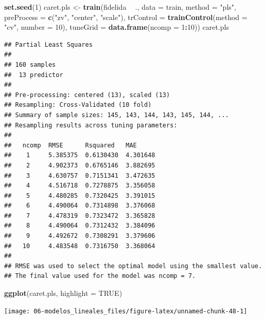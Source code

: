 \documentclass[
  spanish,
]{book}
\newenvironment{Shaded}{\begin{snugshade}}{\end{snugshade}}
\newcommand{\DataTypeTok}[1]{\textcolor[rgb]{0.13,0.29,0.53}{#1}}
\newcommand{\DecValTok}[1]{\textcolor[rgb]{0.00,0.00,0.81}{#1}}
\newcommand{\KeywordTok}[1]{\textcolor[rgb]{0.13,0.29,0.53}{\textbf{#1}}}
\newcommand{\NormalTok}[1]{#1}
\newcommand{\OperatorTok}[1]{\textcolor[rgb]{0.81,0.36,0.00}{\textbf{#1}}}
\newcommand{\OtherTok}[1]{\textcolor[rgb]{0.56,0.35,0.01}{#1}}
\newcommand{\StringTok}[1]{\textcolor[rgb]{0.31,0.60,0.02}{#1}}
\theoremstyle{break}
\theoremstyle{definition}
\theoremstyle{definition}
\theoremstyle{definition}
\theoremstyle{remark}
\begin{document}
\begin{Shaded}
\begin{Highlighting}[]
\KeywordTok{set.seed}\NormalTok{(}\DecValTok{1}\NormalTok{)}
\NormalTok{caret.pls <-}\StringTok{ }\KeywordTok{train}\NormalTok{(fidelida }\OperatorTok{~}\StringTok{ }\NormalTok{., }\DataTypeTok{data =}\NormalTok{ train, }\DataTypeTok{method =} \StringTok{"pls"}\NormalTok{,}
                   \DataTypeTok{preProcess =} \KeywordTok{c}\NormalTok{(}\StringTok{"zv"}\NormalTok{, }\StringTok{"center"}\NormalTok{, }\StringTok{"scale"}\NormalTok{),}
                   \DataTypeTok{trControl =} \KeywordTok{trainControl}\NormalTok{(}\DataTypeTok{method =} \StringTok{"cv"}\NormalTok{, }\DataTypeTok{number =} \DecValTok{10}\NormalTok{),}
                   \DataTypeTok{tuneGrid =} \KeywordTok{data.frame}\NormalTok{(}\DataTypeTok{ncomp =} \DecValTok{1}\OperatorTok{:}\DecValTok{10}\NormalTok{))}
\NormalTok{caret.pls}
\end{Highlighting}
\end{Shaded}

\begin{verbatim}
## Partial Least Squares 
## 
## 160 samples
##  13 predictor
## 
## Pre-processing: centered (13), scaled (13) 
## Resampling: Cross-Validated (10 fold) 
## Summary of sample sizes: 145, 143, 144, 143, 145, 144, ... 
## Resampling results across tuning parameters:
## 
##   ncomp  RMSE      Rsquared   MAE     
##    1     5.385375  0.6130430  4.301648
##    2     4.902373  0.6765146  3.882695
##    3     4.630757  0.7151341  3.472635
##    4     4.516718  0.7278875  3.356058
##    5     4.480285  0.7320425  3.391015
##    6     4.490064  0.7314898  3.376068
##    7     4.478319  0.7323472  3.365828
##    8     4.490064  0.7312432  3.384096
##    9     4.492672  0.7308291  3.379606
##   10     4.483548  0.7316750  3.368064
## 
## RMSE was used to select the optimal model using the smallest value.
## The final value used for the model was ncomp = 7.
\end{verbatim}

\begin{Shaded}
\begin{Highlighting}[]
\KeywordTok{ggplot}\NormalTok{(caret.pls, }\DataTypeTok{highlight =} \OtherTok{TRUE}\NormalTok{)}
\end{Highlighting}
\end{Shaded}

\begin{center}\texttt{[image: 06-modelos\_lineales\_files/figure-latex/unnamed-chunk-48-1]} \end{center}
\end{document}
